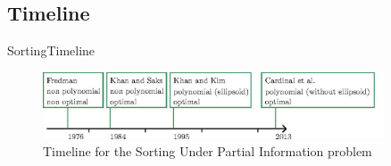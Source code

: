 \subsection{Timeline}
\begin{frame}[c]{Sorting}{Timeline}

\begin{figure}[hbtp]
\centering
\includegraphics[width=0.9\textwidth]{fig/timeline}
\caption{Timeline for the Sorting Under Partial Information problem}
\end{figure}

\end{frame}